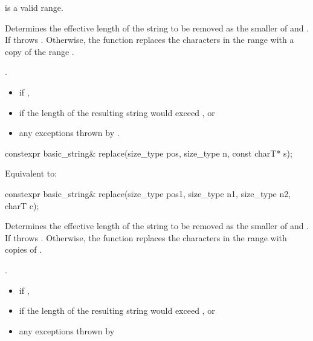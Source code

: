 \begin{itemdescr}
\pnum
\expects
{} is a valid range.

\pnum
\effects
Determines the effective length  of the string to be
removed as the smaller of  and . If
 throws . Otherwise,
the function replaces the characters in the range
with a copy of the range .

\pnum
\returns
{}.

\pnum
\throws
\begin{itemize}
\item {} if ,
\item {} if the length of the resulting string
would exceed , or
\item any exceptions thrown by .
\end{itemize}
\end{itemdescr}

%
\begin{itemdecl}
constexpr basic_string& replace(size_type pos, size_type n, const charT* s);
\end{itemdecl}

\begin{itemdescr}
\pnum
\effects
Equivalent to: 
\end{itemdescr}

%
\begin{itemdecl}
constexpr basic_string& replace(size_type pos1, size_type n1, size_type n2, charT c);
\end{itemdecl}

\begin{itemdescr}
\pnum
\effects
Determines the effective length  of the string to be
removed as the smaller of  and . If
  throws . Otherwise,
the function replaces the characters in the range
with  copies of .

\pnum
\returns
{}.

\pnum
\throws
\begin{itemize}
\item {} if ,
\item {} if the length of the resulting string
would exceed , or
\item any exceptions thrown by 
\end{itemize}
\end{itemdescr}

